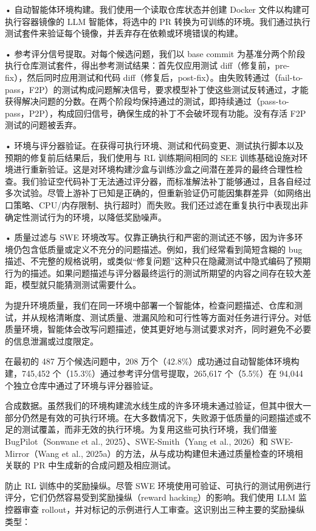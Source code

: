 • 自动智能体环境构建。我们使用一个读取仓库状态并创建 Docker 文件以构建可执行容器镜像的 LLM 智能体，将选中的 PR 转换为可训练的环境。我们通过执行测试套件来验证每个镜像，并丢弃存在依赖或环境错误的构建。

• 参考评分信号提取。对每个候选问题，我们以 base commit 为基准分两个阶段执行仓库测试套件，得出参考测试结果：首先仅应用测试 diff（修复前，pre-fix），然后同时应用测试和代码 diff（修复后，post-fix）。由失败转通过（fail-to-pass，F2P）的测试构成问题解决信号，要求模型补丁使这些测试反转通过，才能获得解决问题的分数。在两个阶段均保持通过的测试，即持续通过（pass-to-pass，P2P），构成回归信号，确保生成的补丁不会破坏现有功能。没有存活 F2P 测试的问题被丢弃。

• 环境与评分器验证。在获得可执行环境、测试和代码变更、测试执行脚本以及预期的修复前后结果后，我们使用与 RL 训练期间相同的 SEE 训练基础设施对环境进行重新验证。这是对环境构建沙盒与训练沙盒之间潜在差异的最终合理性检查。我们验证空代码补丁无法通过评分器，而标准解法补丁能够通过，且各自经过多次试验。尽管上游补丁已知是正确的，但重新验证仍可能因集群差异（如网络出口策略、CPU/内存限制、执行超时）而失败。我们还过滤在重复执行中表现出非确定性测试行为的环境，以降低奖励噪声。

• 质量过滤与 SWE 环境改写。仅靠正确执行和严密的测试还不够，因为许多环境仍包含低质量或定义不充分的问题描述。例如，我们经常看到简短含糊的 bug 描述、不完整的规格说明，或类似“修复问题”这种只在隐藏测试中隐式编码了预期行为的描述。如果问题描述与评分器最终运行的测试所期望的内容之间存在较大差距，模型就只能猜测测试需要什么。

为提升环境质量，我们在同一环境中部署一个智能体，检查问题描述、仓库和测试，并从规格清晰度、测试质量、泄漏风险和可行性等方面对任务进行评分。对低质量环境，智能体会改写问题描述，使其更好地与测试要求对齐，同时避免不必要的信息泄漏或过度限定。

在最初的 487 万个候选问题中，208 万个（42.8\%）成功通过自动智能体环境构建，745,452 个（15.3\%）通过参考评分信号提取，265,617 个（5.5\%）在 94,044 个独立仓库中通过了环境与评分器验证。

合成数据。虽然我们的环境构建流水线生成的许多环境未通过验证，但其中很大一部分仍然是有效的可执行环境。在大多数情况下，失败源于低质量的问题描述或不足的测试覆盖，而非无效的执行环境。为复用这些可执行环境，我们借鉴 BugPilot（Sonwane et al., 2025）、SWE-Smith（Yang et al., 2026）和 SWE-Mirror（Wang et al., 2025a）的方法，从与成功构建但未通过质量检查的环境相关联的 PR 中生成新的合成问题及相应测试。

防止 RL 训练中的奖励操纵。尽管 SWE 环境使用可验证、可执行的测试用例进行评分，它们仍然容易受到奖励操纵（reward hacking）的影响。我们使用 LLM 监控器审查 rollout，并对标记的示例进行人工审查。这识别出三种主要的奖励操纵类型：

